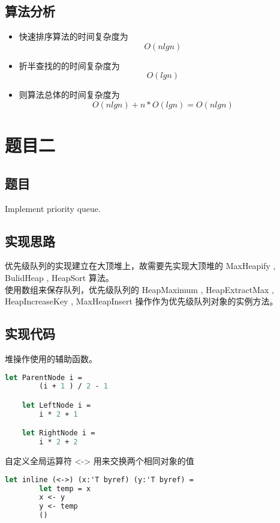 \documentclass[a4paper]{article}
\begin{document}
\subsection{算法分析}

\begin{itemize}
\item
  快速排序算法的时间复杂度为 \[ O(n lg n)\]
\item
  折半查找的的时间复杂度为 \[ O(lg n) \]
\item
  则算法总体的时间复杂度为 \[ O(n lg n) + n*O(lg n) =  O(n lg n) \]
\end{itemize}

\section{题目二}

\subsection{题目}

Implement priority queue.

\subsection{实现思路}

优先级队列的实现建立在大顶堆上，故需要先实现大顶堆的 MaxHeapify , BulidHeap , HeapSort 算法。\\

使用数组来保存队列，优先级队列的 HeapMaximum , HeapExtractMax , HeapIncreaseKey , MaxHeapInsert 操作作为优先级队列对象的实例方法。\\

\subsection{实现代码}

堆操作使用的辅助函数。

\begin{lstlisting}[language=ML]
    let ParentNode i =
        (i + 1 ) / 2 - 1

    let LeftNode i =
        i * 2 + 1

    let RightNode i = 
        i * 2 + 2
\end{lstlisting}

自定义全局运算符 <-> 用来交换两个相同对象的值

\begin{lstlisting}[language=ML]
    let inline (<->) (x:'T byref) (y:'T byref) = 
        let temp = x
        x <- y
        y <- temp 
        ()
\end{lstlisting}
\end{document}
